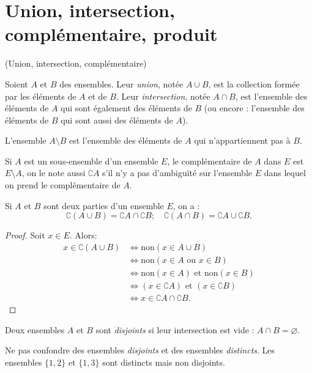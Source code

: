 \section{Union, intersection, complémentaire, produit}

\begin{definition}(Union, intersection, complémentaire)

Soient $A$ et $B$ des ensembles. Leur \emph{union}, notée $A\cup B$, est la collection formée par les éléments de $A$ et de $B$. Leur \emph{intersection}, notée $A\cap B$, est l'ensemble des éléments de $A$ qui sont également des éléments de $B$ (ou encore : l'ensemble des éléments de $B$ qui sont aussi des éléments de $A$). 

L'ensemble $A\setminus B$ est l'ensemble des éléments de $A$ qui n'appartiennent pas à $B$.

Si $A$ est un sous-ensemble d'un ensemble $E$, le complémentaire de $A$ dans $E$ est $E\setminus A$, on le note aussi $\complement A$ s'il n'y a pas d'ambiguïté sur l'ensemble $E$ dans lequel on prend le complémentaire de $A$.
\end{definition}


\begin{proposition}
Si $A$ et $B$ sont deux parties d'un ensemble $E$, on a :
\[
\complement(A\cup B) = \complement A \cap \complement B; \quad
\complement(A\cap B) = \complement A \cup \complement B.
\]
\end{proposition}
\begin{proof}
Soit $x\in E$. Alors:
\begin{align*}
x\in \complement(A\cup B) 
&\iff \text{non}(x \in A\cup B)\\
&\iff \text{non}(x \in A \text{ ou } x\in B)\\
&\iff \text{non}(x \in A) \text{ et } \text{non}(x\in B)\\
&\iff \left(x\in\complement A\right) \text{ et } \left(x\in\complement B\right)\\
&\iff x\in \complement A \cap \complement B.
\end{align*}
\end{proof}

\begin{definition}
Deux ensembles $A$ et $B$ sont \emph{disjoints} si leur intersection est vide : $A\cap B = \varnothing$. 
\end{definition}

\begin{attention}
Ne pas confondre des ensembles \emph{disjoints} et des ensembles \emph{distincts}. Les ensembles $\{1,2\}$ et $\{1,3\}$ sont distincts mais non disjoints.
\end{attention}


